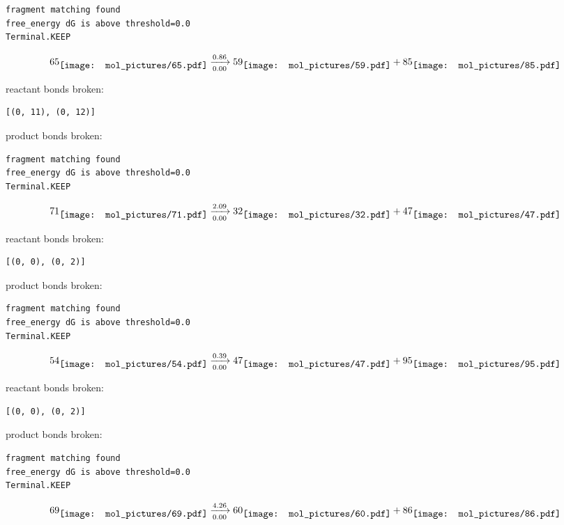 \documentclass{article}
\begin{document}
\vspace{1cm}
\begin{verbatim}
fragment matching found
free_energy dG is above threshold=0.0
Terminal.KEEP
\end{verbatim}
$$
65
\raisebox{-.5\height}{\texttt{[image: mol\_pictures/65.pdf]}}
\xrightarrow[0.00]{0.86}
59
\raisebox{-.5\height}{\texttt{[image: mol\_pictures/59.pdf]}}
+
85
\raisebox{-.5\height}{\texttt{[image: mol\_pictures/85.pdf]}}
$$


reactant bonds broken:\begin{verbatim}
[(0, 11), (0, 12)]
\end{verbatim}
product bonds broken:



\vspace{1cm}
\begin{verbatim}
fragment matching found
free_energy dG is above threshold=0.0
Terminal.KEEP
\end{verbatim}
$$
71
\raisebox{-.5\height}{\texttt{[image: mol\_pictures/71.pdf]}}
\xrightarrow[0.00]{2.09}
32
\raisebox{-.5\height}{\texttt{[image: mol\_pictures/32.pdf]}}
+
47
\raisebox{-.5\height}{\texttt{[image: mol\_pictures/47.pdf]}}
$$


reactant bonds broken:\begin{verbatim}
[(0, 0), (0, 2)]
\end{verbatim}
product bonds broken:



\vspace{1cm}
\begin{verbatim}
fragment matching found
free_energy dG is above threshold=0.0
Terminal.KEEP
\end{verbatim}
$$
54
\raisebox{-.5\height}{\texttt{[image: mol\_pictures/54.pdf]}}
\xrightarrow[0.00]{0.39}
47
\raisebox{-.5\height}{\texttt{[image: mol\_pictures/47.pdf]}}
+
95
\raisebox{-.5\height}{\texttt{[image: mol\_pictures/95.pdf]}}
$$


reactant bonds broken:\begin{verbatim}
[(0, 0), (0, 2)]
\end{verbatim}
product bonds broken:



\vspace{1cm}
\begin{verbatim}
fragment matching found
free_energy dG is above threshold=0.0
Terminal.KEEP
\end{verbatim}
$$
69
\raisebox{-.5\height}{\texttt{[image: mol\_pictures/69.pdf]}}
\xrightarrow[0.00]{4.26}
60
\raisebox{-.5\height}{\texttt{[image: mol\_pictures/60.pdf]}}
+
86
\raisebox{-.5\height}{\texttt{[image: mol\_pictures/86.pdf]}}
$$
\end{document}

